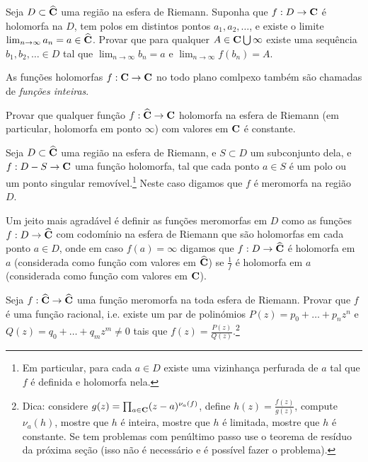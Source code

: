 \begin{problema}
Seja $D\subset\widehat{\mathbf{C}}$ uma região na esfera de Riemann.
Suponha que $f : D \to \mathbf{C}$ é holomorfa na $D$,
tem polos em distintos pontos $a_1,a_2,\dots$,
e existe o limite $\lim_{n\to\infty} a_n = a\in\widehat{\mathbf{C}}$.
Provar que para qualquer $A\in\mathbf{C}\bigcup\infty$ existe uma sequência
$b_1,b_2,\dots\in D$ tal que $\lim_{n\to\infty} b_n = a$
e $\lim_{n\to\infty} f(b_n) = A$.
\end{problema}

\begin{defin}
\label{d:inteira}
As funções holomorfas $f: \mathbf{C} \to \mathbf{C}$ no todo plano comlpexo
também são chamadas de \emph{funções inteiras}.
\end{defin}

\begin{problema}
Provar que qualquer função $f: \widehat{\mathbf{C}} \to \mathbf{C}$
holomorfa na esfera de Riemann (em particular, holomorfa em ponto $\infty$)
com valores em $\mathbf{C}$ é constante.
\end{problema}

\begin{defin}
Seja $D\subset\widehat{\mathbf{C}}$ uma região na esfera de Riemann,
e $S\subset D$ um subconjunto dela,
e $f : D - S\to\mathbf{C}$ uma função holomorfa,
tal que cada ponto $a\in S$ é um polo ou
um ponto singular removível.\footnote{Em particular,
para cada $a\in D$ existe uma vizinhança perfurada de $a$
tal que $f$ é definida e holomorfa nela.}
Neste caso digamos que $f$ é meromorfa na região $D$.

Um jeito mais agradável é definir as funções meromorfas em $D$
como as funções $f: D\to \widehat{\mathbf{C}}$ com codomínio na esfera de Riemann
que são holomorfas em cada ponto $a\in D$, onde
em caso $f(a) = \infty$ digamos que $f : D\to\widehat{\mathbf{C}}$ é holomorfa em $a$
(considerada como função com valores em $\widehat{\mathbf{C}}$)
se $\frac{1}{f}$ é holomorfa em $a$ (considerada como função com valores em $\mathbf{C}$).
\end{defin}

\begin{problema}
Seja $f: \widehat{\mathbf{C}} \to \widehat{\mathbf{C}}$ uma função meromorfa na toda esfera de Riemann.
Provar que $f$ é uma função racional, i.e. existe um par de polinómios
$P(z) = p_0 + \dots + p_n z^n$ e $Q(z) = q_0 + \dots + q_m z^m \neq 0$
tais que $f(z) = \frac{P(z)}{Q(z)}$.\footnote{Dica:
considere $g(z) = \prod_{a\in\mathbf{C}} (z-a)^{\nu_a(f)}$,
define $h(z) = \frac{f(z)}{g(z)}$, compute $\nu_a(h)$,
mostre que $h$ é inteira,
mostre que $h$ é limitada,
mostre que $h$ é constante.
Se tem problemas com penúltimo passo use o teorema de resíduo da próxima seção
(isso não é necessário e é possível fazer o problema).}
\end{problema}


